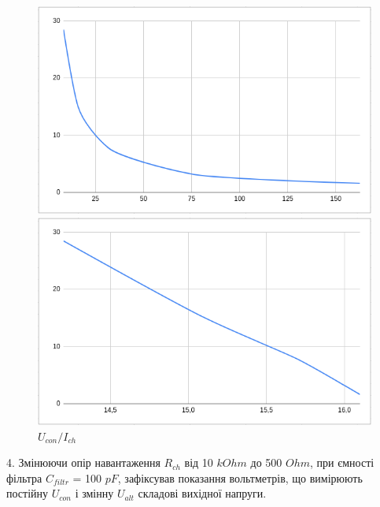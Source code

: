 \documentclass{article}
\begin{document}
\begin{normalsize}
	\begin{figure}[H]
		\begin{minipage}[t]{0.48\textwidth}
			\centering
			\includegraphics[width=\textwidth]{g1}
			\caption{$K_\text{п}/I_{ch}$}
		\end{minipage}
		\hfill
		\begin{minipage}[t]{0.48\textwidth}
			\centering
			\includegraphics[width=\textwidth]{g2}
			\caption{$U_{con}/I_{ch}$}
		\end{minipage}
	\end{figure}

	4. Змінюючи опір навантаження $R_{ch}$ від 10 $kOhm$ до 500 $Ohm$, при ємності фільтра $C_{filtr}$ = 100 $pF$, зафіксував показання вольтметрів, що вимірюють постійну $U_{con}$ і змінну $U_{alt}$ складові вихідної напруги.


\end{normalsize}
\end{document}
